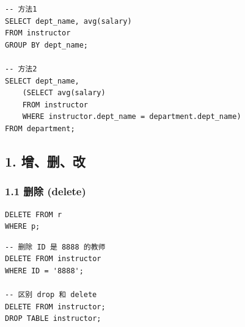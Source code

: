\documentclass[aspectratio=169, 14pt]{beamer}
\begin{document}
\begin{frame}[fragile]
    
    \begin{verbatim}
-- 方法1
SELECT dept_name, avg(salary)
FROM instructor
GROUP BY dept_name;

-- 方法2
SELECT dept_name,
    (SELECT avg(salary)
    FROM instructor
    WHERE instructor.dept_name = department.dept_name)
FROM department;
    \end{verbatim}

\end{frame}

{
    \begin{frame}
        \section{\textcolor{darkmidnightblue}{1. 增、删、改}}
    \end{frame}

}

\begin{frame}[fragile]
    \frametitle{1.1 删除 (delete)}
    
    \begin{verbatim}
DELETE FROM r
WHERE p;
    \end{verbatim}

    \begin{verbatim}
-- 删除 ID 是 8888 的教师
DELETE FROM instructor
WHERE ID = '8888';

-- 区别 drop 和 delete
DELETE FROM instructor;
DROP TABLE instructor;
    \end{verbatim}

\end{frame}
\end{document}
